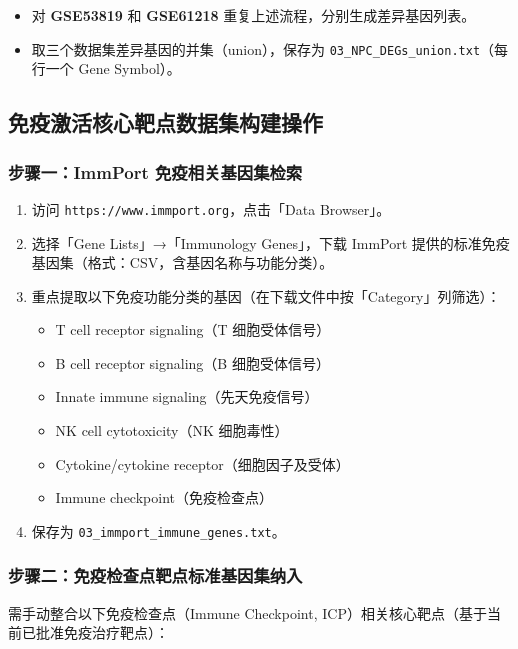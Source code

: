 \documentclass[12pt,a4paper,twoside]{article}
\begin{document}
\begin{itemize}
  \item 对 \textbf{GSE53819} 和 \textbf{GSE61218} 重复上述流程，分别生成差异基因列表。
  \item 取三个数据集差异基因的并集（union），保存为 \texttt{03\_NPC\_DEGs\_union.txt}（每行一个 Gene Symbol）。
\end{itemize}

\subsection{免疫激活核心靶点数据集构建操作}
\label{sec:module3_immune}

\subsubsection{步骤一：ImmPort 免疫相关基因集检索}

\begin{enumerate}
  \item 访问 \texttt{https://www.immport.org}，点击「Data Browser」。
  \item 选择「Gene Lists」→「Immunology Genes」，下载 ImmPort 提供的标准免疫基因集（格式：CSV，含基因名称与功能分类）。
  \item 重点提取以下免疫功能分类的基因（在下载文件中按「Category」列筛选）：
    \begin{itemize}
      \item T cell receptor signaling（T 细胞受体信号）
      \item B cell receptor signaling（B 细胞受体信号）
      \item Innate immune signaling（先天免疫信号）
      \item NK cell cytotoxicity（NK 细胞毒性）
      \item Cytokine/cytokine receptor（细胞因子及受体）
      \item Immune checkpoint（免疫检查点）
    \end{itemize}
  \item 保存为 \texttt{03\_immport\_immune\_genes.txt}。
\end{enumerate}

\subsubsection{步骤二：免疫检查点靶点标准基因集纳入}

需手动整合以下免疫检查点（Immune Checkpoint, ICP）相关核心靶点（基于当前已批准免疫治疗靶点）：
\end{document}
